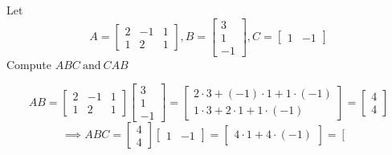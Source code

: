\documentclass[a4paper, 11pt]{article}
\begin{document}
\begin{problem} 
Let \[
    A = \left[\begin{array}{ccc}
            2 & -1 & 1 \\
            1 & 2  & 1
        \end{array}\right],
    B = \left[\begin{array}{c}
            3 \\
            1 \\
            -1
        \end{array}\right],
    C = \left[\begin{array}{cc}
            1 & -1
        \end{array}\right]
\]
Compute \(ABC \:\text{and}\:  CAB\)
\end{problem}
\begin{solution}
    \[
        AB = \left[\begin{array}{ccc}
                2 & -1 & 1 \\
                1 & 2  & 1
            \end{array}\right]\left[\begin{array}{c}
                3 \\
                1 \\
                -1
            \end{array}\right] =
        \left[\begin{array}{cc}
                2 \cdot 3 + (-1) \cdot 1 + 1 \cdot (-1) \\
                1 \cdot 3 + 2 \cdot 1 + 1 \cdot (-1)
            \end{array}\right] =
        \left[\begin{array}{cc}
                4 \\
                4
            \end{array}\right]
    \]
    \[
        \implies ABC = \left[\begin{array}{cc}
                4 \\
                4
            \end{array}\right] \left[\begin{array}{cc}
                1 & -1
            \end{array}\right] =
        \left[\begin{array}{c}
                4 \cdot1 + 4 \cdot (-1)
            \end{array}\right] =
        \left[\begin{array}{c}

\end{array}\]
\end{solution}
\end{document}
